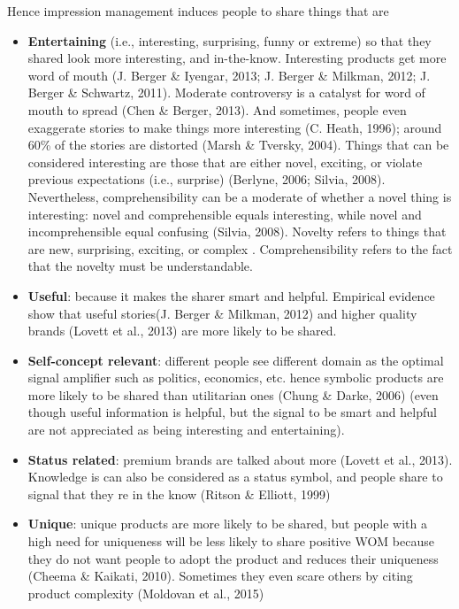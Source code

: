 \documentclass[
]{book}
\begin{document}
Hence impression management induces people to share things that are

\begin{itemize}
\item
  \textbf{Entertaining} (i.e., interesting, surprising, funny or extreme) so that they shared look more interesting, and in-the-know. Interesting products get more word of mouth (J. Berger \& Iyengar, 2013; J. Berger \& Milkman, 2012; J. Berger \& Schwartz, 2011). Moderate controversy is a catalyst for word of mouth to spread (Chen \& Berger, 2013). And sometimes, people even exaggerate stories to make things more interesting (C. Heath, 1996); around 60\% of the stories are distorted (Marsh \& Tversky, 2004). Things that can be considered interesting are those that are either novel, exciting, or violate previous expectations (i.e., surprise) (Berlyne, 2006; Silvia, 2008). Nevertheless, comprehensibility can be a moderate of whether a novel thing is interesting: novel and comprehensible equals interesting, while novel and incomprehensible equal confusing (Silvia, 2008). Novelty refers to things that are new, surprising, exciting, or complex \citep{Berlyne_1960}. Comprehensibility refers to the fact that the novelty must be understandable.
\item
  \textbf{Useful}: because it makes the sharer smart and helpful. Empirical evidence show that useful stories(J. Berger \& Milkman, 2012) and higher quality brands (Lovett et al., 2013) are more likely to be shared.
\item
  \textbf{Self-concept relevant}: different people see different domain as the optimal signal amplifier such as politics, economics, etc. hence symbolic products are more likely to be shared than utilitarian ones (Chung \& Darke, 2006) (even though useful information is helpful, but the signal to be smart and helpful are not appreciated as being interesting and entertaining).
\item
  \textbf{Status related}: premium brands are talked about more (Lovett et al., 2013). Knowledge is can also be considered as a status symbol, and people share to signal that they re in the know (Ritson \& Elliott, 1999)
\item
  \textbf{Unique}: unique products are more likely to be shared, but people with a high need for uniqueness will be less likely to share positive WOM because they do not want people to adopt the product and reduces their uniqueness (Cheema \& Kaikati, 2010). Sometimes they even scare others by citing product complexity (Moldovan et al., 2015)

\end{itemize}
\end{document}
